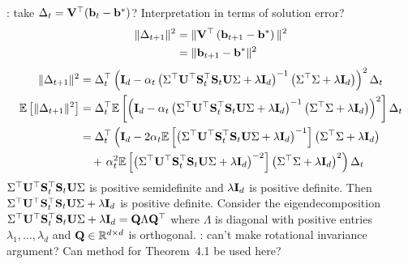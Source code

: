 \documentclass[10pt]{article}
\begin{document}
\todo: take $\Delta_t=\mathbf{V}^\top(\mathbf{b}_t-\mathbf{b}^*)$? Interpretation in terms of solution error?
\begin{align*}
\|\Delta_{t+1}\|^2 &= \|\mathbf{V}^\top\left(\mathbf{b}_{t+1}-\mathbf{b}^*\right)\|^2 \\
&= \|\mathbf{b}_{t+1}-\mathbf{b}^*\|^2
\end{align*}
\begin{align*}
\|\Delta_{t+1}\|^2 &= \Delta_t^\top\left(\mathbf{I}_d - \alpha_t\left(\Sigma^\top\mathbf{U}^\top\mathbf{S}_t^\top\mathbf{S}_t\mathbf{U}\Sigma + \lambda\mathbf{I}_d\right)^{-1}\left(\Sigma^\top\Sigma + \lambda\mathbf{I}_d\right)\right)^2\Delta_t \\
\mathbb{E}\left[\|\Delta_{t+1}\|^2\right] &= \Delta_t^\top\mathbb{E}\left[\left(\mathbf{I}_d - \alpha_t\left(\Sigma^\top\mathbf{U}^\top\mathbf{S}_t^\top\mathbf{S}_t\mathbf{U}\Sigma + \lambda\mathbf{I}_d\right)^{-1}\left(\Sigma^\top\Sigma + \lambda\mathbf{I}_d\right)\right)^2\right]\Delta_t \\
&= \Delta_t^\top\left(\mathbf{I}_d - 2\alpha_t\mathbb{E}\left[\left(\Sigma^\top\mathbf{U}^\top\mathbf{S}_t^\top\mathbf{S}_t\mathbf{U}\Sigma + \lambda\mathbf{I}_d\right)^{-1}\right]\left(\Sigma^\top\Sigma + \lambda\mathbf{I}_d\right)\right. \\
&\quad + \left. \alpha_t^2\mathbb{E}\left[\left(\Sigma^\top\mathbf{U}^\top\mathbf{S}_t^\top\mathbf{S}_t\mathbf{U}\Sigma+ \lambda\mathbf{I}_d\right)^{-2}\right]\left(\Sigma^\top\Sigma + \lambda\mathbf{I}_d\right)^2\right)\Delta_t
\end{align*}
$\Sigma^\top\mathbf{U}^\top\mathbf{S}_t^\top\mathbf{S}_t\mathbf{U}\Sigma$ is positive semidefinite and $\lambda\mathbf{I}_d$ is positive definite. Then $\Sigma^\top\mathbf{U}^\top\mathbf{S}_t^\top\mathbf{S}_t\mathbf{U}\Sigma + \lambda\mathbf{I}_d$ is positive definite. Consider the eigendecomposition $\Sigma^\top\mathbf{U}^\top\mathbf{S}_t^\top\mathbf{S}_t\mathbf{U}\Sigma + \lambda\mathbf{I}_d = \mathbf{Q}\Lambda\mathbf{Q}^\top$ where $\Lambda$ is diagonal with positive entries $\lambda_1,\ldots,\lambda_d$ and $\mathbf{Q}\in\mathbb{R}^{d\times d}$ is orthogonal. \todo: can't make rotational invariance argument? Can method for Theorem~4.1 be used here?
\\
\end{document}
